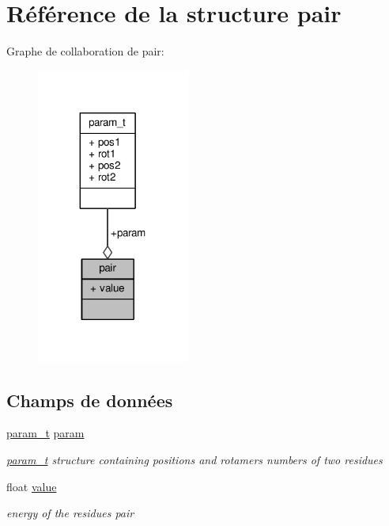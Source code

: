 \hypertarget{structpair}{\section{Référence de la structure pair}
\label{structpair}
}


Graphe de collaboration de pair\+:\nopagebreak
\begin{figure}[H]
\begin{center}
\leavevmode
\includegraphics[width=143pt]{structpair__coll__graph}
\end{center}
\end{figure}
\subsection*{Champs de données}
\begin{DoxyCompactItemize}
\item 
\hyperlink{structparam__t}{param\+\_\+t} \hyperlink{structpair_aacb6fff534dbfa71fe91d5bb6afc6198}{param}
\begin{DoxyCompactList}\small\item\em \hyperlink{structparam__t}{param\+\_\+t} structure containing positions and rotamers numbers of two residues \end{DoxyCompactList}\item 
float \hyperlink{structpair_af0206edb649caff28c1cbc4c194e158d}{value}
\begin{DoxyCompactList}\small\item\em energy of the residues pair \end{DoxyCompactList}\end{DoxyCompactItemize}


